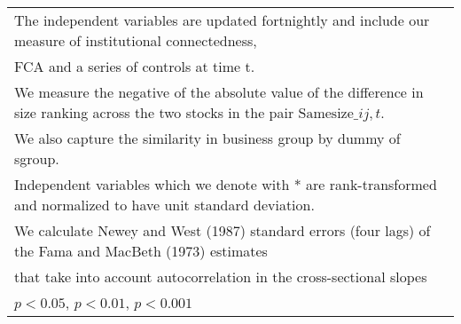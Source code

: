 {\begin{tabular}{l*{7}{c}}
\multicolumn{8}{l}{\footnotesize The independent variables are updated fortnightly and include our measure of institutional connectedness,}\\
\multicolumn{8}{l}{\footnotesize  FCA and a series of controls at time t.}\\
\multicolumn{8}{l}{\footnotesize We measure the negative of the absolute value of the difference in size ranking across the two stocks in the pair $ \text{Samesize}\_{ij,t} $.}\\
\multicolumn{8}{l}{\footnotesize We also capture the similarity in business group by dummy of sgroup.}\\
\multicolumn{8}{l}{\footnotesize Independent variables which  we denote with * are rank-transformed and normalized to have unit standard deviation.}\\
\multicolumn{8}{l}{\footnotesize  We calculate Newey and West (1987) standard errors (four lags) of the Fama and MacBeth (1973) estimates }\\
\multicolumn{8}{l}{\footnotesize  that take into account autocorrelation in the cross-sectional slopes}\\
\multicolumn{8}{l}{\footnotesize \sym{*} \(p<0.05\), \sym{**} \(p<0.01\), \sym{***} \(p<0.001\)}\\
\end{tabular}
}
